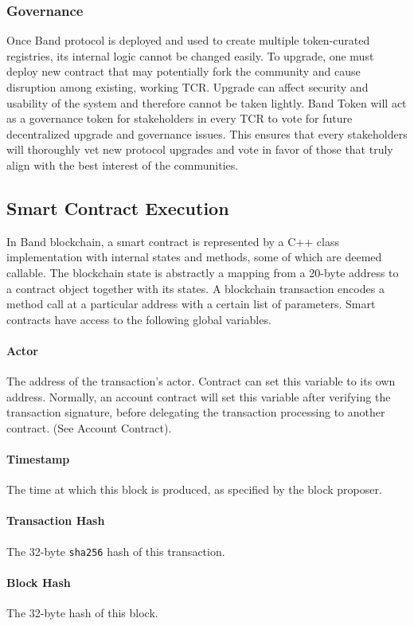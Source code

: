 \documentclass[letterpaper,11pt]{article}
\begin{document}
\subsubsection{Governance} \label{subsubsec:govern}
Once Band protocol is deployed and used to create multiple token-curated registries, its internal logic cannot be changed easily. To upgrade, one must deploy new contract that may potentially fork the community and cause disruption among existing, working TCR. Upgrade can affect security and usability of the system and therefore cannot be taken lightly. Band Token will act as a governance token for stakeholders in every TCR to vote for future decentralized upgrade and governance issues. This ensures that every stakeholders will thoroughly vet new protocol upgrades and vote in favor of those that truly align with the best interest of the communities. 

\subsection{Smart Contract Execution}
In Band blockchain, a smart contract is represented by a C++ class implementation with internal states and methods, some of which are deemed callable. The blockchain state is abstractly a mapping from a 20-byte address to a contract object together with its states. A blockchain transaction encodes a method call at a particular address with a certain list of parameters. Smart contracts have access to the following global variables.

\paragraph{Actor}  The address of the transaction’s actor. Contract can set this variable to its own address. Normally, an account contract will set this variable after verifying the transaction signature, before delegating the transaction processing to another contract. (See Account Contract).
\paragraph{Timestamp} The time at which this block is produced, as specified by the block proposer.
\paragraph{Transaction Hash} The 32-byte {\tt sha256} hash of this transaction.
\paragraph{Block Hash} The 32-byte hash of this block.
\end{document}
